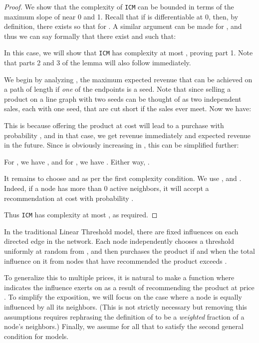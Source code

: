 \documentclass[letterpaper,twoside]{article}
\newcommand{\ICM}[1]{\texttt{ICM}}
\begin{document}
\begin{proof}
    We show that the complexity of \ICM{C} can be bounded in terms
    of the maximum slope of  near 0 and 1. Recall that if  is
    differentiable at 0, then, by definition, there exists  so that
     for . A similar
    argument can be made for , and thus we can say formally that
    there exist  and  such that:
    
    In this case, we will show that \ICM{C} has complexity at most
    , proving part 1. Note that parts 2 and 3 of the lemma will also follow
    immediately.

    We begin by analyzing , the maximum expected revenue that
    can be achieved on a path of length  if {\em one} of the
    endpoints is a seed. Note that  since selling a
    product on a line graph with two seeds can be thought of as
    two independent sales, each with one seed, that are cut short if
    the sales ever meet. Now we have:
    
    This is because offering the product at cost  will lead to
    a purchase with probability , and in that case, we get 
    revenue immediately and  expected revenue in the future.
    Since  is obviously increasing in ,
    this can be simplified further:
    
    For , we have , and for
  , we have . Either way,
    .

    It remains to choose  and  as per the first complexity
    condition. We use , 
    and . Indeed, if a node has more than
    0 active neighbors, it will accept a recommendation at cost
     with probability .

    Thus \ICM{c} has complexity at most , as required.
\end{proof}

In the traditional Linear Threshold model, there are fixed
influences  on each directed edge  in the
network. Each node independently chooses a threshold 
uniformly at random from , and then purchases the product
if and when the total influence on it from nodes that have
recommended the product exceeds .

To generalize this to multiple prices, it is natural to make
 a function  where 
indicates the influence  exerts on  as a result of
recommending the product at price . To simplify the exposition,
we will focus on the case where a node is equally influenced by all
its neighbors. (This is not strictly necessary but removing this
assumptions requires rephrasing the definition of  to be a
{\em weighted} fraction of a node's neighbors.) Finally, we assume
for all  that  to satisfy the second general
condition for models.
\end{document}

